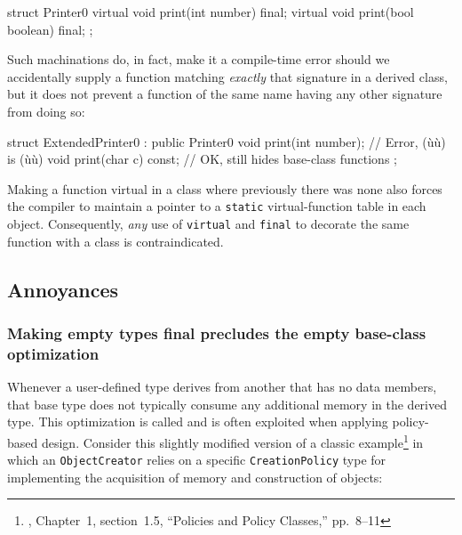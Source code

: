 {\begin{emcppslisting}
struct Printer0
{
    virtual void print(int number) final;
    virtual void print(bool boolean) final;
};
\end{emcppslisting}
    
\enlargethispage*{2ex}%
\noindent Such machinations do, in fact, make it a compile-time error should we
accidentally supply a function matching \emph{exactly} that signature in
a derived class, but it does not prevent a function of the same name
having any other signature from doing so:

\begin{emcppslisting}
struct ExtendedPrinter0 : public Printer0
{
    void print(int number);    // Error, (ù{}ù) is (ù{}ù)
    void print(char c) const;  // OK, still hides base-class functions
};
\end{emcppslisting}
    

\noindent Making a function virtual in a class where previously there was none
also forces the compiler to maintain a pointer to a \lstinline!static!
virtual-function table in each object. Consequently, \emph{any} use of
\lstinline!virtual! and \lstinline!final! to decorate the same function with a
class is contraindicated.

\subsection[Annoyances]{Annoyances}\label{annoyances-final}

\subsubsection[Making empty types \lstinline!final! precludes the empty base-class optimization]{Making empty types {\SubsubsecCode final} precludes the empty base-class optimization}\label{making-empty-types-final-precludes-the-empty-base-class-optimization}

Whenever a user-defined type derives from another that has no data
members, that base type does not typically consume any additional memory
in the derived type. This optimization is called  and is often exploited when applying
policy-based design. Consider this slightly modified version of a
classic example{\cprotect\footnote{\cite{alexandrescu01}, Chapter~1, section~1.5, ``Policies and Policy Classes,'' pp.~8--11}} in which an
\lstinline!ObjectCreator! relies on a specific \lstinline!CreationPolicy! type
for implementing the acquisition of memory and construction of objects:

}
